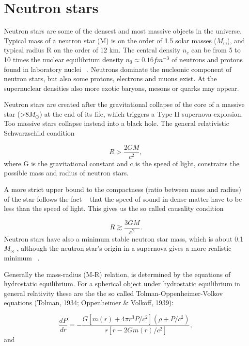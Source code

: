\documentclass{wihuri}
\begin{document}
\section{Neutron stars}


Neutron stars are some of the densest and most massive objects in the
universe. Typical mass of a neutron star (M) is on the order of 1.5 solar masses ($M_{\odot}$), and typical radius R on the order of 12 km. The central density $n_{c}$ can be from 5 to 10 times the nuclear equilibrium density $n_{0} \approx 0.16 fm^{-3}$ of neutrons and protons found in laboratory nuclei ~\cite{lattimer}. Neutrons dominate the nucleonic component of neutron stars, but also some protons, electrons and muons exist. At the supernuclear densities also more exotic baryons, mesons or quarks may appear.

 
Neutron stars are created after the gravitational collapse of the core of a
massive star (>8$M_{\odot}$) at the end of its life, which triggers a Type II supernova explosion. Too massive stars collapse instead into a black hole. The general relativistic Schwarzschild condition 

\begin{equation}
 R > \frac{2GM}{c^{2}},
 \end{equation} 
where G is the gravitational constant and c is the speed of light, constrains the possible mass and radius of neutron stars.

A more strict upper bound to the compactness (ratio between mass and radius) of the star follows
the fact ~\cite{rhoades} %
that the speed of sound in dense matter have to be less than the speed of light. This gives us the so called causality condition

\begin{equation}
 R \gtrsim \frac{3GM}{c^{2}}.
 \end{equation} 
Neutron stars have also a minimum stable neutron star mass, which is about 0.1 $M_{\odot}$ , although the neutron star’s origin in a supernova gives a more realistic minimum ~\cite{lattimer}.



Generally the mass-radius (M-R) relation, is determined by the equations of hydrostatic equilibrium. For a spherical object under hydrostatic equilibrium in general relativity these are the the so called Tolman-Oppenheimer-Volkov equations (Tolman,
1934; Oppenheimer \& Volkoff, 1939):


\begin{equation}
 \frac{dP}{dr} = -\frac{G[m(r)+4 \pi r^{3}P/c^{2}](\rho + P/c^{2})}{r[r-2Gm(r)/c^{2}]},
 \end{equation} 
and
\end{document}
